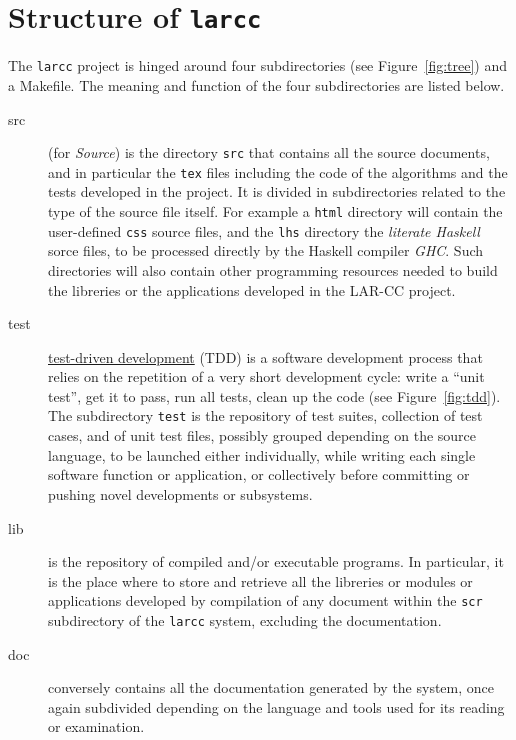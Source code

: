 \documentclass[11pt,oneside]{article}	%
\begin{document}
\section{Structure of \texttt{larcc}}

The \texttt{larcc} project is hinged around four subdirectories (see Figure~\ref{fig:tree}) and a Makefile.
The meaning and function of the four subdirectories are listed below.

\begin{description}
\item[src]  (for \emph{Source})
is the directory \texttt{src}  that contains all the source documents, and in particular the \texttt{tex} files including the code of the algorithms and the tests developed in the project. It is divided in subdirectories related to the type of the source file itself. For example a \texttt{html} directory will contain the user-defined \texttt{css} source files, and the \texttt{lhs} directory the \emph{literate Haskell} sorce files, to be processed directly by the Haskell compiler \emph{GHC}.
Such directories will also contain other programming resources needed to build the libreries or the applications developed in the LAR-CC project.

\item[test] 
\href{http://en.wikipedia.org/wiki/Test-driven_development}{test-driven development} (TDD) is a software development process that relies on the repetition of a very short development cycle: write a ``unit test'', get it to pass, run all tests, clean up the code (see Figure~\ref{fig:tdd}).
The subdirectory \texttt{test} is the repository of test suites, collection of test cases, and of unit test files, possibly grouped depending on the source language, to be launched either individually, while writing each single software function or application, or collectively before committing or pushing novel developments or subsystems. 

\item[lib] 
is the repository of compiled and/or executable programs. In particular, it is the place where to store and retrieve all the libreries or modules or applications developed by compilation of any  document within the \texttt{scr} subdirectory of the \texttt{larcc} system, excluding the documentation.

\item[doc] 
conversely contains all the documentation generated by the system, once again subdivided depending on the language and tools used for its reading or examination.
\end{description}
\end{document}

